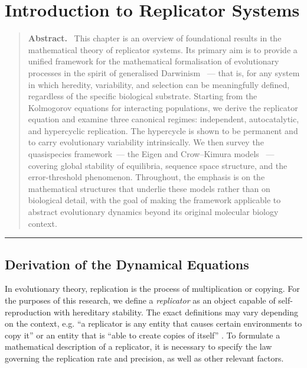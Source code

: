 \documentclass[12pt]{report}
\theoremstyle{definition}
\theoremstyle{remark}
\newenvironment{chapterabstract}
  {\begin{quotation}\small\noindent\textbf{Abstract.}\ }
  {\end{quotation}}
\begin{document}
\chapter{Introduction to Replicator Systems}
\label{ch:1}

\begin{chapterabstract}
	This chapter is an overview of foundational results in the
	mathematical theory of replicator systems. Its primary aim is to
	provide a unified framework for the mathematical formalisation of
	evolutionary processes in the spirit of generalised Darwinism ~---
	that is, for any system in which heredity, variability, and
	selection can be meaningfully defined, regardless of the specific
	biological substrate. Starting from the Kolmogorov equations for
	interacting populations, we derive the replicator equation and
	examine three canonical regimes: independent, autocatalytic, and
	hypercyclic replication. The hypercycle is shown to be permanent
	and to carry evolutionary variability intrinsically. We then survey
	the quasispecies framework~--- the Eigen and Crow--Kimura models ~--- covering global stability of equilibria, sequence space
	structure, and the error-threshold phenomenon. Throughout, the
	emphasis is on the mathematical structures that underlie these
	models rather than on biological detail, with the goal of making
	the framework applicable to abstract evolutionary dynamics beyond
	its original molecular biology context.

\end{chapterabstract}

\bigskip\hrule\bigskip

\section{Derivation of the Dynamical Equations}
\label{c1:section:1.1}

In evolutionary theory, replication is the process of multiplication or copying.  For the purposes of this research, we define a \emph{replicator} as an object capable of self-reproduction with hereditary stability. The exact definitions may vary depending on the context, e.g. ``a replicator is any
entity that causes certain environments to copy it'' \cite{c1:Deutsch1997} or an entity that is ``able to create copies of itself'' \cite{c1:Dawkins1976}. To formulate a mathematical description of a replicator, it is necessary to specify the law governing the replication rate and precision, as well as other relevant factors.
\end{document}
